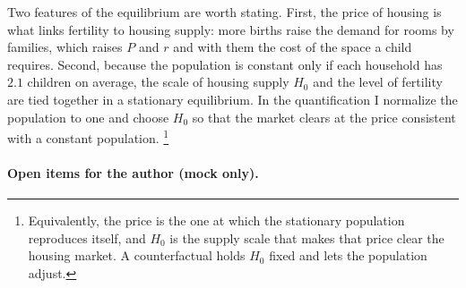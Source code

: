 Two features of the equilibrium are worth stating. First, the price of
housing is what links fertility to housing supply: more births raise the
demand for rooms by families, which raises $P$ and $r$ and with them the cost
of the space a child requires. Second, because the population is constant
only if each household has $2.1$ children on average, the scale of housing
supply $H_0$ and the level of fertility are tied together in a stationary
equilibrium. In the quantification I normalize the population to one and
choose $H_0$ so that the market clears at the price consistent with a constant
population.%
\footnote{Equivalently, the price is the one at which the stationary
population reproduces itself, and $H_0$ is the supply scale that makes that
price clear the housing market. A counterfactual holds $H_0$ fixed and lets
the population adjust.}


\paragraph{Open items for the author (mock only).}
